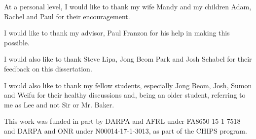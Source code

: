 \begin{acknowledgements}
At a personal level, I would like to thank my wife Mandy and my children Adam, Rachel and Paul for their encouragement.

I would like to thank my advisor, Paul Franzon for his help in making this possible.

I would also like to thank Steve Lipa, Jong Beom Park and Josh Schabel for their feedback on this dissertation.

I would also like to thank my fellow students, especially Jong Beom, Josh, Sumon and Weifu for their healthy discussions and, being an older student, referring to me as Lee and not Sir or Mr. Baker.

This work was funded in part by DARPA and AFRL under FA8650-15-1-7518 and DARPA and ONR under N00014-17-1-3013, as part of the CHIPS program.
\end{acknowledgements}


\iftrue

\thesistableofcontents

\thesislistoftables

\thesislistoffigures

\fi
